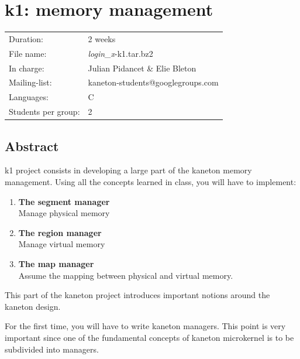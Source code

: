 
%
%

\chapter{k1: memory management}

%
%

\begin{tabular}{p{7cm}l}
  Duration: & 2 weeks \\
  File name: & {\em login\_x}-k1.tar.bz2 \\
  In charge: & Julian Pidancet \& Elie Bleton\\
  Mailing-list: & kaneton-students@googlegroups.com \\
  Languages: & C \\
  Students per group: & 2 \\
\end{tabular}

\section{Abstract}

k1 project consists in developing a large part of the kaneton memory management. Using all the concepts learned in class, you will have to implement:

\begin{enumerate}
\item
  {\bf The segment manager}\\
  Manage physical memory
\item
  {\bf The region manager}\\
  Manage virtual memory
\item
  {\bf The map manager}\\
  Assume the mapping between physical and virtual memory.\\
\end{enumerate}

This part of the kaneton project introduces important notions around the
kaneton design.

For the first time, you will have to write kaneton managers. This point is
very important since one of the fundamental concepts of kaneton microkernel
is to be subdivided into managers.

